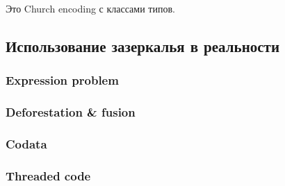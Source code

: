 Это Church encoding с классами типов.

\cite{gibbons2013functional, gibbons2014folding}






\subsection{Использование зазеркалья в реальности}



\subsubsection{Expression problem}




\subsubsection{Deforestation \& fusion}







\subsubsection{Codata}


\subsubsection{Threaded code}

